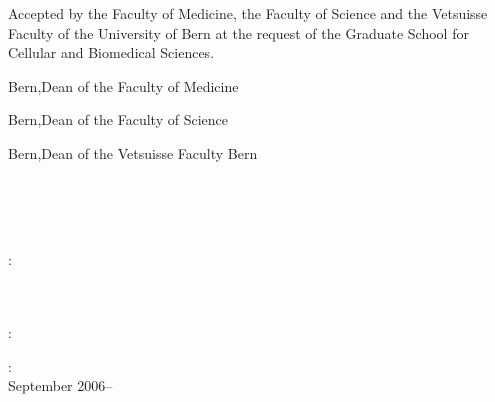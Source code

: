 \thispagestyle{empty}
\noindent Accepted by the Faculty of Medicine, the Faculty of Science and the Vetsuisse Faculty of the University of Bern at the request of the Graduate School for Cellular and Biomedical Sciences.

\vspace{2.5cm}
\noindent Bern,\hfill Dean of the Faculty of Medicine

\vspace{2.5cm}
\noindent Bern,\hfill Dean of the Faculty of Science

\vspace{2.5cm}
\noindent Bern,\hfill Dean of the Vetsuisse Faculty Bern\\
\vfill

\noindent\myName\\\emph{\myTitle}\\\myDegree\\\myVersion

\bigskip
\noindent{}:\\
\myProf \\
\myOtherProf \\ 
\mySupervisor

\medskip

\noindent{}:\\
\noindent\myLocation

\medskip
\noindent{}:\\
September 2006--\myTime